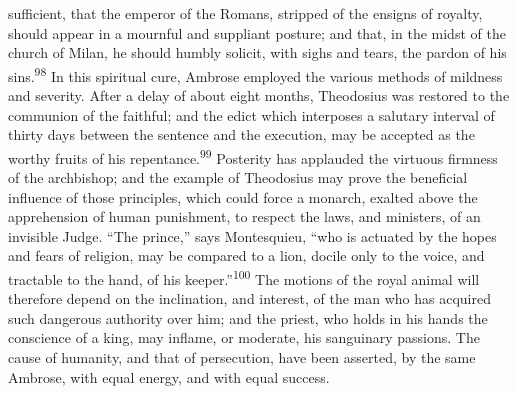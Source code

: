 sufficient, that the emperor of the Romans, stripped of the
ensigns of royalty, should appear in a mournful and suppliant
posture; and that, in the midst of the church of Milan, he should
humbly solicit, with sighs and tears, the pardon of his sins.\textsuperscript{98}
In this spiritual cure, Ambrose employed the various methods of
mildness and severity. After a delay of about eight months,
Theodosius was restored to the communion of the faithful; and the
edict which interposes a salutary interval of thirty days between
the sentence and the execution, may be accepted as the worthy
fruits of his repentance.\textsuperscript{99} Posterity has applauded the virtuous
firmness of the archbishop; and the example of Theodosius may
prove the beneficial influence of those principles, which could
force a monarch, exalted above the apprehension of human
punishment, to respect the laws, and ministers, of an invisible
Judge. “The prince,” says Montesquieu, “who is actuated by the
hopes and fears of religion, may be compared to a lion, docile
only to the voice, and tractable to the hand, of his keeper.”\textsuperscript{100}
The motions of the royal animal will therefore depend on the
inclination, and interest, of the man who has acquired such
dangerous authority over him; and the priest, who holds in his
hands the conscience of a king, may inflame, or moderate, his
sanguinary passions. The cause of humanity, and that of
persecution, have been asserted, by the same Ambrose, with equal
energy, and with equal success.




